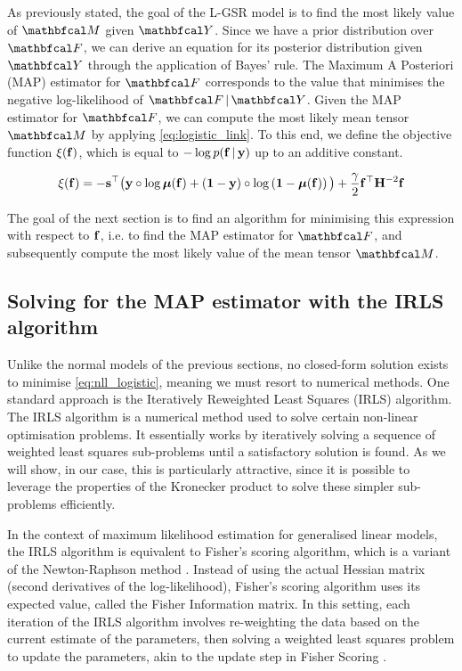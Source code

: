As previously stated, the goal of the L-GSR model is to find the most likely value of $\Mt$ given $\Yt$. Since we have a prior distribution over $\Ft$, we can derive an equation for its posterior distribution given $\Yt$ through the application of Bayes' rule. The Maximum A Posteriori (MAP) estimator for $\Ft$ corresponds to the value that minimises the negative log-likelihood of $\Ft \, | \, \Yt$. Given the MAP estimator for $\Ft$, we can compute the most likely mean tensor $\Mt$ by applying \cref{eq:logistic_link}. To this end, we define the objective function $\xi(\mathbf{f})$, which is equal to $-\log p(\mathbf{f} \, | \, \mathbf{y})$ up to an additive constant.
 
\begin{equation}
    \label{eq:nll_logistic}
    \xi(\mathbf{f}) = -\mathbf{s}^\top \big(\mathbf{y} \circ \log \boldsymbol{\mu}(\mathbf{f}) + \left(\mathbf{1}  - \mathbf{y}\right) \circ \log \left(\mathbf{1} - \boldsymbol{\mu}(\mathbf{f}) \right)\big) + \frac{\gamma}{2} \mathbf{f}^\top \mathbf{H}^{-2} \mathbf{f}
\end{equation}

The goal of the next section is to find an algorithm for minimising this expression with respect to $\mathbf{f}$, i.e. to find the MAP estimator for $\Ft$, and subsequently compute the most likely value of the mean tensor $\Mt$. 


\subsection{Solving for the MAP estimator with the IRLS algorithm}

Unlike the normal models of the previous sections, no closed-form solution exists to minimise \cref{eq:nll_logistic}, meaning we must resort to numerical methods. One standard approach is the Iteratively Reweighted Least Squares (IRLS) algorithm. The IRLS algorithm is a numerical method used to solve certain non-linear optimisation problems. It essentially works by iteratively solving a sequence of weighted least squares sub-problems until a satisfactory solution is found. As we will show, in our case, this is particularly attractive, since it is possible to leverage the properties of the Kronecker product to solve these simpler sub-problems efficiently. 

In the context of maximum likelihood estimation for generalised linear models, the IRLS algorithm is equivalent to Fisher's scoring algorithm, which is a variant of the Newton-Raphson method \citep{Nelder1972}. Instead of using the actual Hessian matrix (second derivatives of the log-likelihood), Fisher's scoring algorithm uses its expected value, called the Fisher Information matrix. In this setting, each iteration of the IRLS algorithm involves re-weighting the data based on the current estimate of the parameters, then solving a weighted least squares problem to update the parameters, akin to the update step in Fisher Scoring \citep{Fan2020}.

